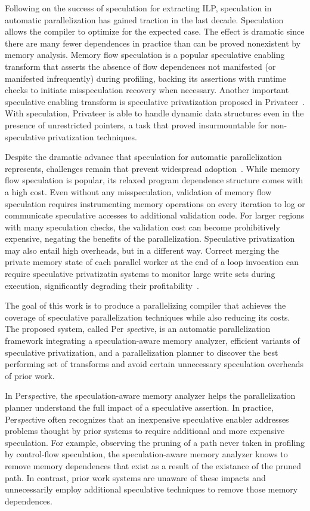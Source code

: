 Following on the success of speculation for extracting ILP,
speculation in automatic parallelization has gained traction in the
last decade.  Speculation allows the compiler to optimize for the
expected case.  The effect is dramatic since there are many
fewer dependences in practice than can be proved nonexistent by memory
analysis.  Memory flow speculation is a popular speculative enabling
transform that asserts the absence of flow dependences not manifested
(or manifested infrequently) during profiling, backing its assertions
with runtime checks to initiate misspeculation recovery when
necessary.  Another important speculative enabling transform is
speculative privatization proposed in
Privateer~\cite{johnson:12:pldi}.  With speculation,
Privateer is able to handle dynamic data structures even in the
presence of unrestricted pointers, a task that proved insurmountable
for non-speculative privatization techniques.

Despite the dramatic advance that speculation for automatic
parallelization represents, challenges remain that prevent widespread
adoption~\cite{cascaval:08:stmtoy:short,prabhu:03:ppopp,kelsey:09:cgo}.
While memory flow speculation is popular, its relaxed program
dependence structure comes with a high cost.  Even without any
misspeculation, validation of memory flow speculation requires
instrumenting memory operations on every iteration to log or
communicate speculative accesses to additional validation code.  For
larger regions with many speculation checks, the validation cost can
become prohibitively expensive, negating the benefits of the
parallelization.  Speculative privatization may also entail high
overheads, but in a different way.  Correct merging the private memory
state of each parallel worker at the end of a loop invocation can
require speculative privatizatin systems to monitor large write sets
during execution, significantly degrading their
profitability~\cite{kim:12:cgo,johnson:12:pldi,rauchwerger:99:pds}.

The goal of this work is to produce a parallelizing compiler that
achieves the coverage of speculative parallelization techniques while
also reducing its costs.  The proposed system, called Per{\em
  spec}tive, is an automatic parallelization framework integrating a
speculation-aware memory analyzer, efficient variants of speculative
privatization, and a parallelization planner to discover the best
performing set of transforms and avoid certain unnecessary
speculation overheads of prior work.

In Per{\em spec}tive, the speculation-aware memory analyzer helps the
parallelization planner understand the full impact of a speculative
assertion.  In practice, Per{\em spec}tive often recognizes that an
inexpensive speculative enabler addresses problems thought by prior
systems to require additional and more expensive speculation.  For
example, observing the pruning of a path never taken in profiling by
control-flow speculation, the speculation-aware memory analyzer knows
to remove memory dependences that exist as a result of the existance
of the pruned path.  In contrast, prior work systems are unaware of
these impacts and unnecessarily employ additional speculative
techniques to remove those memory dependences.

